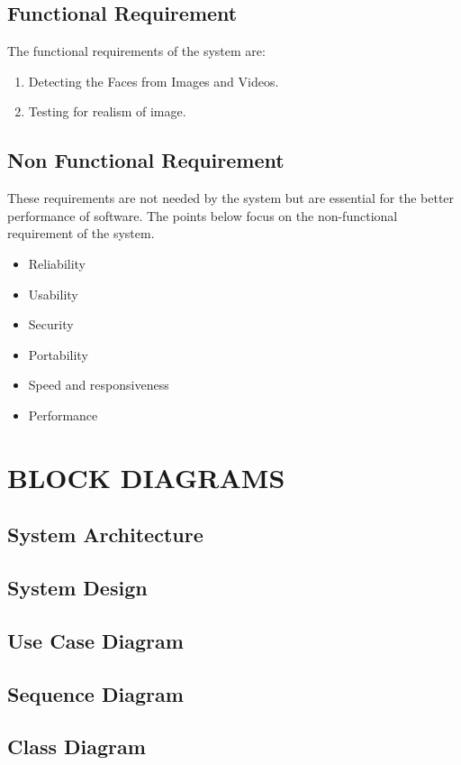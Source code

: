 \documentclass[12 pt]{article}
\begin{document}
\subsection{Functional Requirement}
The functional requirements of the system are:
\begin{enumerate}
    \item Detecting the Faces from Images and Videos.
    \item Testing for realism of image.
\end{enumerate}

\subsection{Non Functional Requirement}
\justify
These requirements are not needed by the system but are essential for the better
performance of software. The points below focus on the non-functional requirement of
the system.
\begin{itemize}
    \item Reliability
    \item   Usability
    \item   Security
    \item   Portability
    \item   Speed and responsiveness
    \item  Performance
\end{itemize}


\newpage

\section{BLOCK DIAGRAMS}
\newpage
\subsection{System Architecture}
\newpage
\subsection{System Design}
\newpage
\subsection{Use Case Diagram}
\newpage
\subsection{Sequence Diagram}
\newpage
\subsection{Class Diagram}
\newpage
\end{document}
